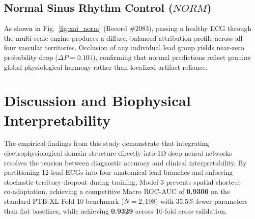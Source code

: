 \documentclass[5p,twocolumn,10pt]{elsarticle}
\begin{document}
\subsection{Normal Sinus Rhythm Control ($NORM$)}
As shown in Fig.~\ref{fig:xai_norm} (Record \#2083), passing a healthy ECG through the multi-scale engine produces a diffuse, balanced attribution profile across all four vascular territories. Occlusion of any individual lead group yields near-zero probability drop ($\Delta P = 0.101$), confirming that normal predictions reflect genuine global physiological harmony rather than localized artifact reliance.

\section{Discussion and Biophysical Interpretability}
\label{sec:discussion}

The empirical findings from this study demonstrate that integrating electrophysiological domain structure directly into 1D deep neural networks resolves the tension between diagnostic accuracy and clinical interpretability. By partitioning 12-lead ECGs into four anatomical lead branches and enforcing stochastic territory-dropout during training, Model 3 prevents spatial shortcut co-adaptation, achieving a competitive Macro ROC-AUC of \textbf{0.9306} on the standard PTB-XL Fold 10 benchmark ($N = 2,198$) with 35.5\% fewer parameters than flat baselines, while achieving \textbf{0.9329} across 10-fold cross-validation.
\end{document}
